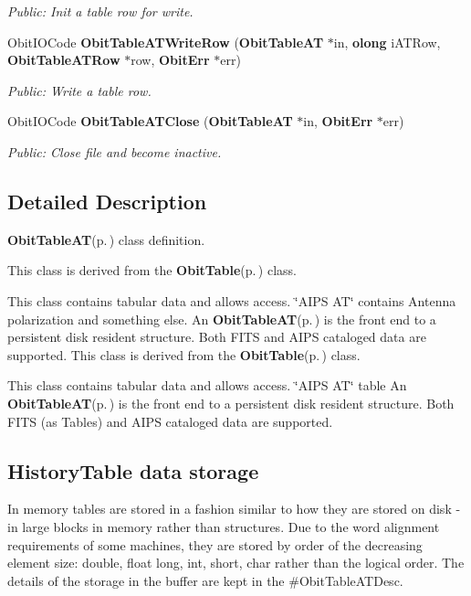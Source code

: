 \begin{CompactItemize}
\begin{CompactList}\small\item\em Public: Init a table row for write. \item\end{CompactList}\item 
Obit\-IOCode {\bf Obit\-Table\-ATWrite\-Row} ({\bf Obit\-Table\-AT} $\ast$in, {\bf olong} i\-ATRow, {\bf Obit\-Table\-ATRow} $\ast$row, {\bf Obit\-Err} $\ast$err)
\begin{CompactList}\small\item\em Public: Write a table row. \item\end{CompactList}\item 
Obit\-IOCode {\bf Obit\-Table\-ATClose} ({\bf Obit\-Table\-AT} $\ast$in, {\bf Obit\-Err} $\ast$err)
\begin{CompactList}\small\item\em Public: Close file and become inactive. \item\end{CompactList}\end{CompactItemize}


\subsection{Detailed Description}
{\bf Obit\-Table\-AT}{\rm (p.\,\pageref{structObitTableAT})} class definition. 

This class is derived from the {\bf Obit\-Table}{\rm (p.\,\pageref{structObitTable})} class.

This class contains tabular data and allows access. \char`\"{}AIPS AT\char`\"{} contains Antenna polarization and something else. An {\bf Obit\-Table\-AT}{\rm (p.\,\pageref{structObitTableAT})} is the front end to a persistent disk resident structure. Both FITS and AIPS cataloged data are supported. This class is derived from the {\bf Obit\-Table}{\rm (p.\,\pageref{structObitTable})} class.

This class contains tabular data and allows access. \char`\"{}AIPS AT\char`\"{} table An {\bf Obit\-Table\-AT}{\rm (p.\,\pageref{structObitTableAT})} is the front end to a persistent disk resident structure. Both FITS (as Tables) and AIPS cataloged data are supported.\subsection{History\-Table data storage}\label{ObitTableWX_8h_TableDataStorage}
In memory tables are stored in a fashion similar to how they are stored on disk - in large blocks in memory rather than structures. Due to the word alignment requirements of some machines, they are stored by order of the decreasing element size: double, float long, int, short, char rather than the logical order. The details of the storage in the buffer are kept in the \#Obit\-Table\-ATDesc.

